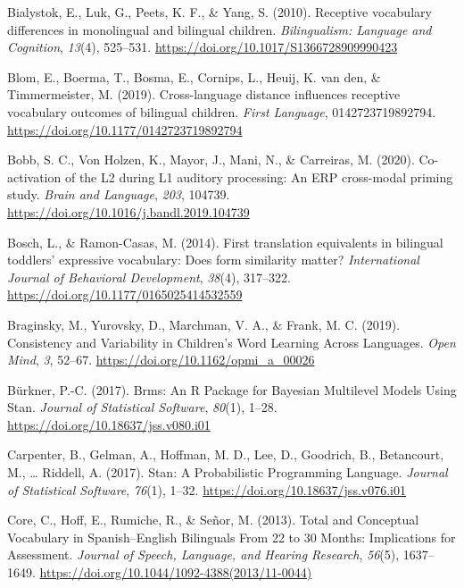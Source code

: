 \documentclass[
  english,
  man,man,floatsintext]{apa6}
\begin{document}
\leavevmode\hypertarget{ref-bialystok2010}{}%
Bialystok, E., Luk, G., Peets, K. F., \& Yang, S. (2010). Receptive vocabulary differences in monolingual and bilingual children. \emph{Bilingualism: Language and Cognition}, \emph{13}(4), 525--531. \url{https://doi.org/10.1017/S1366728909990423}

\leavevmode\hypertarget{ref-blom2019}{}%
Blom, E., Boerma, T., Bosma, E., Cornips, L., Heuij, K. van den, \& Timmermeister, M. (2019). Cross-language distance influences receptive vocabulary outcomes of bilingual children. \emph{First Language}, 0142723719892794. \url{https://doi.org/10.1177/0142723719892794}

\leavevmode\hypertarget{ref-bobb2020}{}%
Bobb, S. C., Von Holzen, K., Mayor, J., Mani, N., \& Carreiras, M. (2020). Co-activation of the L2 during L1 auditory processing: An ERP cross-modal priming study. \emph{Brain and Language}, \emph{203}, 104739. \url{https://doi.org/10.1016/j.bandl.2019.104739}

\leavevmode\hypertarget{ref-bosch2014}{}%
Bosch, L., \& Ramon-Casas, M. (2014). First translation equivalents in bilingual toddlers' expressive vocabulary: Does form similarity matter? \emph{International Journal of Behavioral Development}, \emph{38}(4), 317--322. \url{https://doi.org/10.1177/0165025414532559}

\leavevmode\hypertarget{ref-braginsky2019}{}%
Braginsky, M., Yurovsky, D., Marchman, V. A., \& Frank, M. C. (2019). Consistency and Variability in Children's Word Learning Across Languages. \emph{Open Mind}, \emph{3}, 52--67. \url{https://doi.org/10.1162/opmi_a_00026}

\leavevmode\hypertarget{ref-burkner2017}{}%
Bürkner, P.-C. (2017). Brms: An R Package for Bayesian Multilevel Models Using Stan. \emph{Journal of Statistical Software}, \emph{80}(1), 1--28. \url{https://doi.org/10.18637/jss.v080.i01}

\leavevmode\hypertarget{ref-carpenter2017}{}%
Carpenter, B., Gelman, A., Hoffman, M. D., Lee, D., Goodrich, B., Betancourt, M., \ldots{} Riddell, A. (2017). Stan: A Probabilistic Programming Language. \emph{Journal of Statistical Software}, \emph{76}(1), 1--32. \url{https://doi.org/10.18637/jss.v076.i01}

\leavevmode\hypertarget{ref-core2013}{}%
Core, C., Hoff, E., Rumiche, R., \& Señor, M. (2013). Total and Conceptual Vocabulary in Spanish--English Bilinguals From 22 to 30 Months: Implications for Assessment. \emph{Journal of Speech, Language, and Hearing Research}, \emph{56}(5), 1637--1649. \url{https://doi.org/10.1044/1092-4388(2013/11-0044)}
\end{document}
